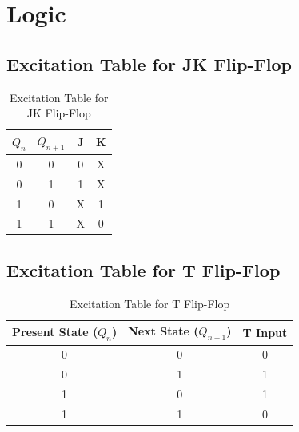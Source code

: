 \documentclass[a4paper,12pt]{article}
\begin{document}
\section{Logic}
\subsection{Excitation Table for JK Flip-Flop}
\begin{table}[H]
    \centering
    \renewcommand{\arraystretch}{1.3}
    \begin{tabular}{|c|c||c|c|}
        \hline
        \textbf{$Q_n$} & \textbf{$Q_{n+1}$} & \textbf{J} & \textbf{K} \\
        \hline
        0 & 0 & 0 & X \\
        0 & 1 & 1 & X \\
        1 & 0 & X & 1 \\
        1 & 1 & X & 0 \\
        \hline
    \end{tabular}
    \caption{Excitation Table for JK Flip-Flop}
    \label{tab:jk_excitation}
\end{table}

\subsection{Excitation Table for T Flip-Flop}
\begin{table}[h!]
\centering
\caption{Excitation Table for T Flip-Flop}
\begin{tabular}{|c|c|c|}
\hline
\textbf{Present State ($Q_n$)} & \textbf{Next State ($Q_{n+1}$)} & \textbf{T Input} \\
\hline
0 & 0 & 0 \\
0 & 1 & 1 \\
1 & 0 & 1 \\
1 & 1 & 0 \\
\hline
\end{tabular}
\end{table}
\end{document}
